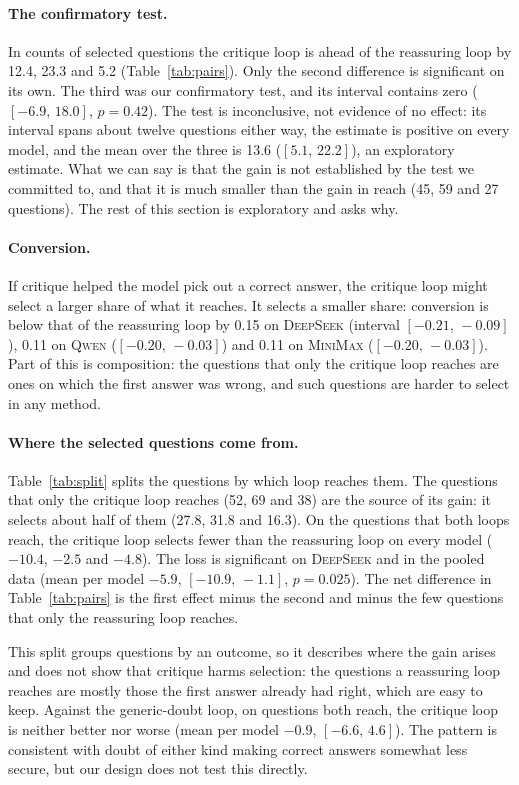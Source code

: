 \documentclass[11pt]{article}
\newcommand{\ds}{\textsc{DeepSeek}}
\newcommand{\qw}{\textsc{Qwen}}
\newcommand{\mm}{\textsc{MiniMax}}
\newcommand{\ci}[2]{$[#1,\,#2]$}
\begin{document}
\paragraph{The confirmatory test.}
In counts of selected questions the critique loop is ahead of the reassuring loop by 12.4, 23.3 and 5.2 (Table~\ref{tab:pairs}).
Only the second difference is significant on its own.
The third was our confirmatory test, and its interval contains zero (\ci{-6.9}{18.0}, $p=0.42$).
The test is inconclusive, not evidence of no effect: its interval spans about twelve questions either way, the estimate is positive on every model, and the mean over the three is 13.6 (\ci{5.1}{22.2}), an exploratory estimate.
What we can say is that the gain is not established by the test we committed to, and that it is much smaller than the gain in reach (45, 59 and 27 questions).
The rest of this section is exploratory and asks why.

\paragraph{Conversion.}
If critique helped the model pick out a correct answer, the critique loop might select a larger share of what it reaches.
It selects a smaller share: conversion is below that of the reassuring loop by 0.15 on \ds{} (interval \ci{-0.21}{-0.09}), 0.11 on \qw{} (\ci{-0.20}{-0.03}) and 0.11 on \mm{} (\ci{-0.20}{-0.03}).
Part of this is composition: the questions that only the critique loop reaches are ones on which the first answer was wrong, and such questions are harder to select in any method.

\paragraph{Where the selected questions come from.}
Table~\ref{tab:split} splits the questions by which loop reaches them.
The questions that only the critique loop reaches (52, 69 and 38) are the source of its gain: it selects about half of them (27.8, 31.8 and 16.3).
On the questions that both loops reach, the critique loop selects fewer than the reassuring loop on every model ($-10.4$, $-2.5$ and $-4.8$).
The loss is significant on \ds{} and in the pooled data (mean per model $-5.9$, \ci{-10.9}{-1.1}, $p=0.025$).
The net difference in Table~\ref{tab:pairs} is the first effect minus the second and minus the few questions that only the reassuring loop reaches.

This split groups questions by an outcome, so it describes where the gain arises and does not show that critique harms selection: the questions a reassuring loop reaches are mostly those the first answer already had right, which are easy to keep.
Against the generic-doubt loop, on questions both reach, the critique loop is neither better nor worse (mean per model $-0.9$, \ci{-6.6}{4.6}).
The pattern is consistent with doubt of either kind making correct answers somewhat less secure, but our design does not test this directly.
\end{document}
